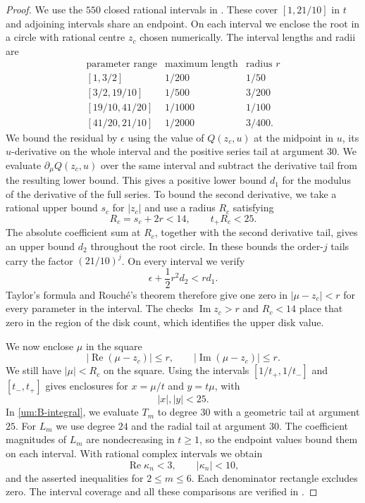 \documentclass[a4paper,11pt]{amsart}
\numberwithin{equation}{section}
\theoremstyle{plain}
\theoremstyle{definition}
\begin{document}
\begin{proof}
We use the \(550\) closed rational intervals in
. These
cover \([1,21/10]\) in \(t\) and adjoining intervals share an
endpoint. On each interval we enclose the root in a circle with
rational centre \(z_c\) chosen numerically. The interval lengths
and radii are
\[
\begin{array}{c|c|c}
 \text{parameter range}&\text{maximum length}&\text{radius }r\\
 {[1,3/2]}&1/200&1/50\\
 {[3/2,19/10]}&1/500&3/200\\
 {[19/10,41/20]}&1/1000&1/100\\
 {[41/20,21/10]}&1/2000&3/400.
\end{array}
\]
We bound the residual by \(\epsilon\) using the value of
\(Q(z_c,u)\) at the midpoint in \(u\), its \(u\)-derivative on the
whole interval and the positive series tail at argument \(30\).
We evaluate \(\partial_\mu Q(z_c,u)\) over the same interval and
subtract the derivative tail from the resulting lower bound. This
gives a positive lower bound \(d_1\) for the modulus of the
derivative of the full series. To bound the second derivative,
we take a rational upper bound \(s_c\) for \(|z_c|\) and use a
radius \(R_c\) satisfying
\[
 R_c=s_c+2r<14,\qquad t_+R_c<25.
\]
The absolute coefficient sum at \(R_c\), together with the second
derivative tail, gives an upper bound \(d_2\) throughout the root
circle. In these bounds the order-\(j\) tails carry the factor
\((21/10)^j\). On every interval we verify
\[
 \epsilon+\frac12r^2d_2<rd_1.
\]
Taylor's formula and Rouch\'e's theorem therefore give one zero
in \(|\mu-z_c|<r\) for every parameter in the interval. The checks
\(\operatorname{Im}z_c>r\) and \(R_c<14\) place that zero in the
region of the disk count, which identifies the upper disk value.

We now enclose \(\mu\) in the square
\[
 |\operatorname{Re}(\mu-z_c)|\le r,\qquad
 |\operatorname{Im}(\mu-z_c)|\le r.
\]
We still have \(|\mu|<R_c\) on the square. Using the intervals
\([1/t_+,1/t_-]\) and \([t_-,t_+]\) gives enclosures for
\(x=\mu/t\) and \(y=t\mu\), with
\[
 |x|,|y|<25.
\]
In \eqref{um:B-integral}, we evaluate \(T_m\) to degree \(30\)
with a geometric tail at argument \(25\). For \(L_m\) we use
degree \(24\) and the radial tail at argument \(30\).
The coefficient magnitudes of \(L_m\) are nondecreasing in
\(t\ge1\), so the endpoint values bound them on each interval.
With rational complex intervals we obtain
\[
 \operatorname{Re}\kappa_n<3,\qquad |\kappa_n|<10,
\]
and the asserted inequalities for \(2\le m\le6\). Each
denominator rectangle excludes zero. The interval coverage and
all these comparisons are verified in
.


\end{proof}
\end{document}
